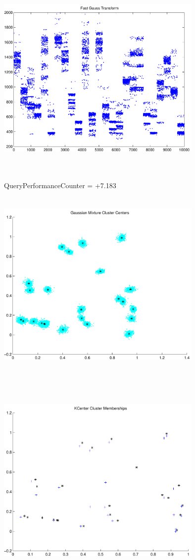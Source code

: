 \documentclass[9pt]{article}
\theoremstyle{plain}
\theoremstyle{definition}
\theoremstyle{remark}
\numberwithin{equation}{section}
\begin{document}
\includegraphics[width=10.0cm,height=10.0cm]{FGT25_Centers.pdf}

QueryPerformanceCounter  =  +7.183
\includegraphics[width=10.0cm,height=10.0cm]{GaussianMixture_ClusterCenters24_Centers.pdf}

\includegraphics[width=10.0cm,height=10.0cm]{KCenterClusterMemberships_24_Centers.pdf}
\end{document}
